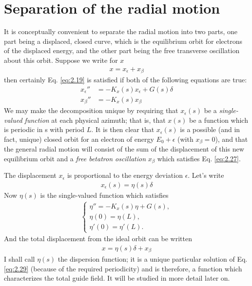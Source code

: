 \section{Separation of the radial motion} \label{sec:2.4}
It is conceptually convenient to separate the radial motion into two parts, one part being a displaced, closed curve, which is the equilibrium orbit for electrons of the displaced energy, and the other part being the free transverse oscillation about this orbit. Suppose we write for $x$
\begin{align}
	x = x_{\epsilon} + x_{\beta}\label{eq:2.25}
\end{align}
then certainly Eq. \eqref{eq:2.19} is satisfied if both of the following equations are true:
\begin{align}
	x_\epsilon'' &= -K_x(s)x_\epsilon + G(s)\delta\label{eq:2.26}\\
	x_\beta'' &= -K_x(s)x_\beta\label{eq:2.27}
\end{align}
We may make the decomposition unique by requiring that $x_\epsilon(s)$ be a \textit{single-valued function} at each physical azimuth; that is, that $x(s)$ be a function which is periodic in s with period $L$. It is then clear that $x_\epsilon(s)$ is a possible (and in fact, unique) closed orbit for an electron of energy $E_0 + \epsilon$ (with $x_\beta = 0$), and that the general radial motion will consist of the sum of the displacement of this new equilibrium orbit and a \textit{free betatron oscillation} $x_\beta$ which satisfies Eq. \eqref{eq:2.27}.

The displacement $x_\epsilon$ is proportional to the energy deviation $\epsilon$. Let’s write
\begin{align}
	x_\epsilon(s) = \eta(s)\delta\label{eq:2.28}
\end{align}
Now $\eta(s)$ is the single-valued function which satisfies
\begin{align}\label{eq:2.29}
	\begin{cases}
		\eta'' = -K_x(s)\eta + G(s), \\
        \eta(0) = \eta(L), \\
        \eta'(0) = \eta'(L).
    \end{cases}
\end{align}
And the total displacement from the ideal orbit can be written
\begin{align}
	x = \eta(s)\delta + x_\beta
\end{align}
I shall call $\eta(s)$ the dispersion function; it is a unique particular solution of Eq. \eqref{eq:2.29} (because of the required periodicity) and is therefore, a function which characterizes the total guide field. It will be studied in more detail later on.
